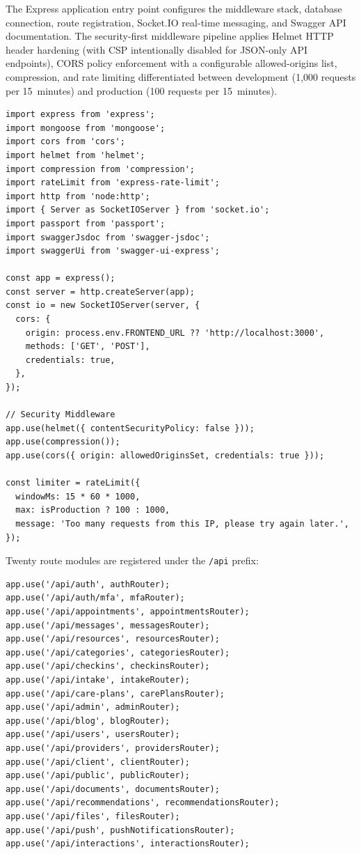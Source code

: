 \documentclass[12pt,letterpaper]{article}
\begin{document}
The Express application entry point configures the middleware stack, database connection, route registration, Socket.IO real-time messaging, and Swagger API documentation. The security-first middleware pipeline applies Helmet HTTP header hardening (with CSP intentionally disabled for JSON-only API endpoints), CORS policy enforcement with a configurable allowed-origins list, compression, and rate limiting differentiated between development (1,000 requests per 15~minutes) and production (100 requests per 15~minutes).

\begin{lstlisting}[caption={Server initialization and security middleware (\texttt{server.ts})}]
import express from 'express';
import mongoose from 'mongoose';
import cors from 'cors';
import helmet from 'helmet';
import compression from 'compression';
import rateLimit from 'express-rate-limit';
import http from 'node:http';
import { Server as SocketIOServer } from 'socket.io';
import passport from 'passport';
import swaggerJsdoc from 'swagger-jsdoc';
import swaggerUi from 'swagger-ui-express';

const app = express();
const server = http.createServer(app);
const io = new SocketIOServer(server, {
  cors: {
    origin: process.env.FRONTEND_URL ?? 'http://localhost:3000',
    methods: ['GET', 'POST'],
    credentials: true,
  },
});

// Security Middleware
app.use(helmet({ contentSecurityPolicy: false }));
app.use(compression());
app.use(cors({ origin: allowedOriginsSet, credentials: true }));

const limiter = rateLimit({
  windowMs: 15 * 60 * 1000,
  max: isProduction ? 100 : 1000,
  message: 'Too many requests from this IP, please try again later.',
});
\end{lstlisting}

Twenty route modules are registered under the \texttt{/api} prefix:

\begin{lstlisting}[caption={API route registration (\texttt{server.ts})}]
app.use('/api/auth', authRouter);
app.use('/api/auth/mfa', mfaRouter);
app.use('/api/appointments', appointmentsRouter);
app.use('/api/messages', messagesRouter);
app.use('/api/resources', resourcesRouter);
app.use('/api/categories', categoriesRouter);
app.use('/api/checkins', checkinsRouter);
app.use('/api/intake', intakeRouter);
app.use('/api/care-plans', carePlansRouter);
app.use('/api/admin', adminRouter);
app.use('/api/blog', blogRouter);
app.use('/api/users', usersRouter);
app.use('/api/providers', providersRouter);
app.use('/api/client', clientRouter);
app.use('/api/public', publicRouter);
app.use('/api/documents', documentsRouter);
app.use('/api/recommendations', recommendationsRouter);
app.use('/api/files', filesRouter);
app.use('/api/push', pushNotificationsRouter);
app.use('/api/interactions', interactionsRouter);
\end{lstlisting}
\end{document}
